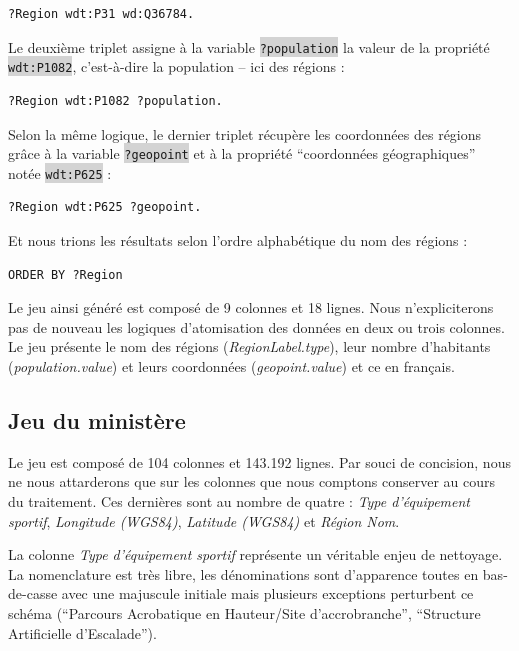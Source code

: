 \documentclass[hidelinks, 12pt]{report}
\newcommand{\code}[1]{\colorbox{LightGray}{\texttt{#1}}}
\begin{document}
\begin{lstlisting}[language=SPARQL]
	?Region wdt:P31 wd:Q36784.
\end{lstlisting}

Le deuxième triplet assigne à la variable \code{?population} la valeur de la propriété \code{wdt:P1082}, c'est-à-dire la population -- ici des régions :

\begin{lstlisting}[language=SPARQL]
	?Region wdt:P1082 ?population.
\end{lstlisting}

Selon la même logique, le dernier triplet récupère les coordonnées des régions grâce à la variable \code{?geopoint} et à la propriété \enquote{coordonnées géographiques} notée \code{wdt:P625} :

\begin{lstlisting}[language=SPARQL]
	?Region wdt:P625 ?geopoint.
\end{lstlisting}

Et nous trions les résultats selon l'ordre alphabétique du nom des régions :

\begin{lstlisting}[language=SPARQL]
	ORDER BY ?Region
\end{lstlisting}

Le jeu ainsi généré est composé de 9 colonnes et 18 lignes. Nous n'expliciterons pas de nouveau les logiques d'atomisation des données en deux ou trois colonnes. Le jeu présente le nom des régions (\textit{RegionLabel.type}), leur nombre d'habitants (\textit{population.value}) et leurs coordonnées (\textit{geopoint.value}) et ce en français.





%





\subsection{Jeu du ministère}

Le jeu est composé de 104 colonnes et 143.192 lignes. Par souci de concision, nous ne nous attarderons que sur les colonnes que nous comptons conserver au cours du traitement. Ces dernières sont au nombre de quatre : \textit{Type d'équipement sportif}, \textit{Longitude (WGS84)}, \textit{Latitude (WGS84)} et \textit{Région Nom}.

La colonne \textit{Type d'équipement sportif} représente un véritable enjeu de nettoyage. La nomenclature est très libre, les dénominations sont d'apparence toutes en bas-de-casse avec une majuscule initiale mais plusieurs exceptions perturbent ce schéma (\enquote{Parcours Acrobatique en Hauteur/Site d'accrobranche}, \enquote{Structure Artificielle d'Escalade}).
\end{document}
